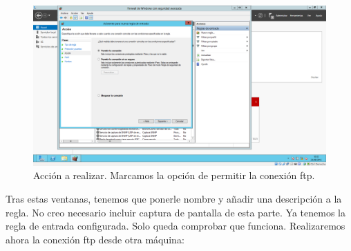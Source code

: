 \begin{itemize}
\begin{itemize}
		\begin{figure}[H]
			\centering
			\includegraphics[width=0.7\linewidth]{PermitirConexionFTP}
			\caption[Permitir conexión]{Acción a realizar. Marcamos la opción de permitir la conexión ftp.}
			\label{fig:PermitirConexionFTP}
		\end{figure}
		
		Tras estas ventanas, tenemos que ponerle nombre y añadir una descripción a la regla. No creo necesario incluir captura de pantalla de esta parte. Ya tenemos la regla de entrada configurada. Solo queda comprobar que funciona. Realizaremos ahora la conexión ftp desde otra máquina:\\
		
		
		
			
	\end{itemize}

\end{itemize}	
	
